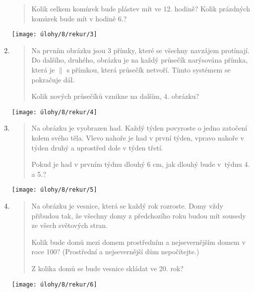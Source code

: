 \begin{enumerate}
\begin{minipage}[t]{\linewidth}
\begin{quote}
            Kolik celkem komůrek bude plástev mít ve 12. hodině? Kolik prázdných komůrek bude mít v hodině 6.?
        \end{quote}
        \centering
        \texttt{[image: úlohy/8/rekur/3]}
    \end{minipage}

    \item
    \begin{minipage}[t]{\linewidth}
        \begin{quote}
            Na prvním obrázku jsou 3 přímky, které se všechny navzájem protínají. Do dalšího, druhého, obrázku je na každý průsečík narýsována přímka, která je $\|$ s přímkou, která průsečík netvoří. Tímto systémem se pokračuje dál.

            Kolik nových průsečíků vznikne na dalším, 4. obrázku?
        \end{quote}
        \centering
        \texttt{[image: úlohy/8/rekur/4]}
    \end{minipage}

    \item
    \begin{minipage}[t]{\linewidth}
        \begin{quote}
            Na obrázku je vyobrazen had. Každý týden povyroste o jedno zatočení kolem svého těla. Vlevo nahoře je had v první týden, vpravo nahoře v týden druhý a uprostřed dole v týden třetí.

            Pokud je had v prvním týdnu dlouhý 6 cm, jak dlouhý bude v~týdnu 4. a 5.?
        \end{quote}
        \centering
        \texttt{[image: úlohy/8/rekur/5]}
    \end{minipage}

    \item
    \begin{minipage}[t]{\linewidth}
        \begin{quote}
            Na obrázku je vesnice, která se každý rok rozroste. Domy vždy přibudou tak, že všechny domy z předchozího roku budou mít sousedy ze všech světových stran.

            Kolik bude domů mezi domem prostředním a nejsevernějším domem v roce 100? (Prostřední a nejsevernější dům nepočítejte.)

            Z kolika domů se bude vesnice skládat ve 20. rok?
        \end{quote}
        \centering
        \texttt{[image: úlohy/8/rekur/6]}
    \end{minipage}


\end{enumerate}

